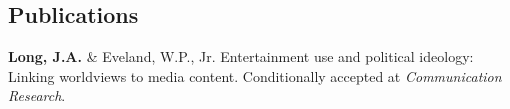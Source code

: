 \documentclass[margin,line]{res}
\begin{document}
\begin{resume}



\section{\sc Publications}
\textbf{Long, J.A.} \& Eveland, W.P., Jr. Entertainment use and political ideology: Linking worldviews to media content. Conditionally accepted at \emph{Communication Research}.
 








\end{resume}
\end{document}
